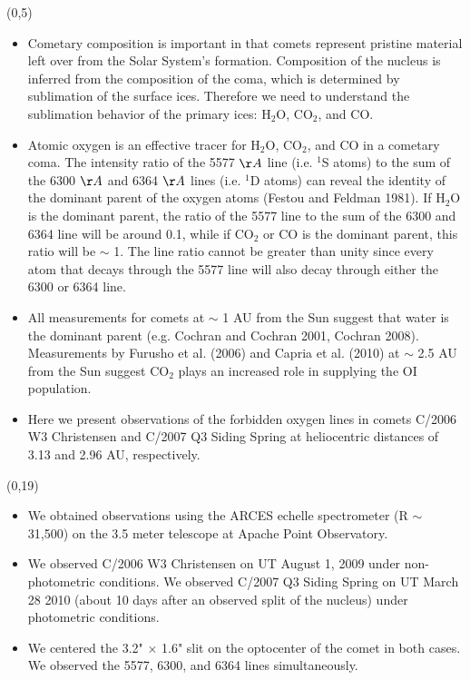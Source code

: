 \documentclass[a0]{a0poster}
\def\SecTitle#1{\noindent{\veryHuge\color{Green} #1}}
\begin{document}
\begin{textblock}{12}(0,5)
\center
\SecTitle{Introduction}\\
\bigskip
\raggedright
\normalsize
{
\begin{itemize}
\item Cometary composition is important in that comets represent pristine material left over from the Solar System's formation.  Composition of the nucleus is inferred from the composition of the coma, which is determined by sublimation of the surface ices.  Therefore we need to understand the sublimation behavior of the primary ices: H$_2$O, CO$_2$, and CO.
\item Atomic oxygen is an effective tracer for H$_2$O, CO$_2$, and CO in a cometary coma.  The intensity ratio of the 5577 $\AA$ line (i.e. $^1$S atoms) to the sum of the 6300 $\AA$ and 6364 $\AA$ lines (i.e. $^1$D atoms) can reveal the identity of the dominant parent of the oxygen atoms (Festou and Feldman 1981).  If H$_2$O is the dominant parent, the ratio of the 5577 line to the sum of the 6300 and 6364 line will be around 0.1, while if CO$_2$ or CO is the dominant parent, this ratio will be $\sim$ 1.  The line ratio cannot be greater than unity since every atom that decays through the 5577 line will also decay through either the 6300 or 6364 line. 
\item All measurements for comets at $\sim$ 1 AU from the Sun suggest that water is the dominant parent (e.g. Cochran and Cochran 2001, Cochran 2008).  Measurements by Furusho et al. (2006) and Capria et al. (2010) at $\sim$ 2.5 AU from the Sun suggest CO$_2$ plays an increased role in supplying the OI population.
\item Here we present observations of the forbidden oxygen lines in comets C/2006 W3 Christensen and C/2007 Q3 Siding Spring at heliocentric distances of 3.13 and 2.96 AU, respectively.
\end{itemize}
}
\end{textblock}

\begin{textblock}{12}(0,19)
\center
\SecTitle{Observations}\\
\bigskip
\raggedright
\normalsize
{
\begin{itemize}
\item We obtained observations using the ARCES echelle spectrometer (R $\sim$ 31,500) on the 3.5 meter telescope at Apache Point Observatory.
\item We observed C/2006 W3 Christensen on UT August 1, 2009 under non-photometric conditions.  We observed C/2007 Q3 Siding Spring on UT March 28 2010 (about 10 days after an observed split of the nucleus) under photometric conditions.
\item We centered the 3.2" $\times$ 1.6" slit on the optocenter of the comet in both cases.  We observed the 5577, 6300, and 6364 lines simultaneously.
\end{itemize}
}
\end{textblock}
\end{document}
